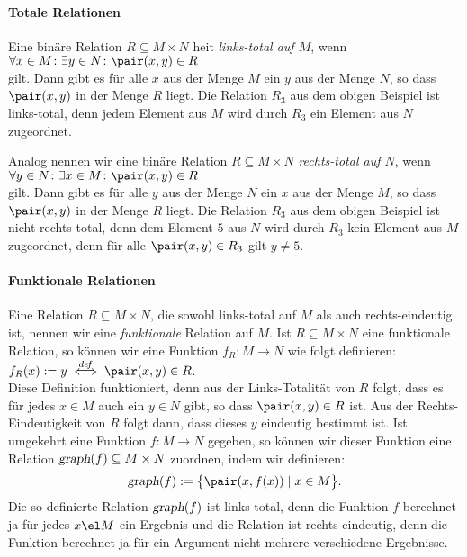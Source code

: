 \paragraph{Totale Relationen}
Eine bin\"{a}re Relation $R \subseteq M \times N$ hei\3t \emph{links-total auf $M$}, wenn \\[0.2cm]
\hspace*{1.3cm} $\forall x \in M \colon \exists y \in N \colon \pair(x,y) \in R$ \\[0.2cm]
gilt. Dann gibt es f\"{u}r alle $x$ aus der Menge $M$ ein $y$ aus der Menge $N$, so dass
$\pair(x,y)$ in der Menge  $R$ liegt.  Die Relation $R_3$ aus dem obigen Beispiel ist
links-total, denn jedem Element aus $M$ wird durch $R_3$ ein Element aus $N$ zugeordnet.

Analog nennen wir eine bin\"{a}re Relation $R \subseteq M \times N$  \emph{rechts-total auf $N$}, wenn \\[0.2cm]
\hspace*{1.3cm} $\forall y \in N \colon \exists x \in M \colon \pair(x,y) \in R$ \\[0.2cm]
gilt. Dann gibt es f\"{u}r alle $y$ aus der Menge $N$ ein $x$ aus der Menge $M$, so dass
$\pair(x,y)$ in der Menge  $R$ liegt.  Die Relation $R_3$ aus dem obigen Beispiel ist
nicht rechts-total, denn dem Element $5$ aus $N$ wird durch $R_3$ kein Element aus $M$
zugeordnet, denn f\"{u}r alle $\pair(x,y) \in R_3$ gilt $y \not= 5$.

\paragraph{Funktionale Relationen}
Eine Relation $R \subseteq M \times N$, die sowohl links-total auf $M$ als auch rechts-eindeutig
ist, nennen wir eine \emph{funktionale} Relation auf $M$.  Ist $R \subseteq M \times N$ eine
funktionale Relation, so k\"{o}nnen wir eine Funktion $f_R\colon M \rightarrow N$ wie folgt
definieren: \\[0.2cm]
\hspace*{1.3cm} $f_R(x) := y \;\stackrel{de\!f}{\Longleftrightarrow}\; \pair(x,y) \in R$. \\[0.2cm]
Diese Definition funktioniert, denn aus der Links-Totalit\"{a}t von $R$ folgt, dass es f\"{u}r
jedes $x\in M$ auch ein $y \in N$ gibt, so dass $\pair(x,y) \in R$ ist.  Aus der
Rechts-Eindeutigkeit von $R$ folgt dann, dass dieses $y$ eindeutig bestimmt ist.
Ist umgekehrt eine Funktion \mbox{$f:M \rightarrow N$} gegeben, so k\"{o}nnen wir dieser Funktion
eine Relation $\textsl{graph}(f) \subseteq M \times N$ zuordnen, indem wir definieren: 
\[ \textsl{graph}(f) := \bigl\{ \pair(x,f(x)) \mid  x\in M \bigr\}. \]
Die so definierte Relation $\textsl{graph}(f)$ ist links-total, denn die Funktion $f$
berechnet ja f\"{u}r jedes $x \el M$ ein Ergebnis und die Relation ist rechts-eindeutig,
denn die Funktion berechnet ja f\"{u}r ein Argument nicht mehrere verschiedene Ergebnisse.

